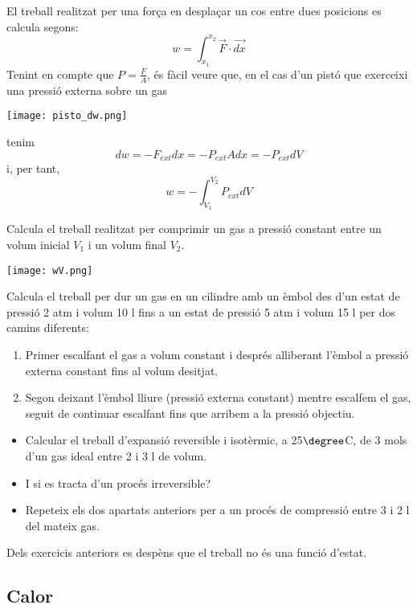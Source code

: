 El treball realitzat per una força en desplaçar un cos entre dues posicions es calcula segons:
\[
w=\int_{x_1}^{x_2} \vec{F} \cdot \vec{dx}
\]
Tenint en compte que $P=\frac{F}{A}$, és fàcil veure que, en el cas d'un pistó que exerceixi una pressió externa sobre un gas 
\begin{center}
\texttt{[image: pisto\_dw.png]}
\end{center}
tenim
\[
dw=-F_{ext}dx = -P_{ext} A dx = -P_{ext} dV
\]
i, per tant,
\[
w=-\int_{V_1}^{V_2} P_{ext} dV
\]
\begin{exr}
Calcula el treball realitzat per comprimir un gas a pressió constant entre un volum inicial $V_1$ i un volum final $V_2$.
\begin{center}
\texttt{[image: wV.png]}
\end{center}
\end{exr}
\begin{exr}
Calcula el treball per dur un gas en un cilindre amb un èmbol des d'un estat de pressió 2 atm i volum 10 l fins a un estat de pressió 5 atm i volum 15 l per dos camins diferents:
\begin{enumerate}
\item Primer escalfant el gas a volum constant i després alliberant l'èmbol a pressió externa constant fins al volum desitjat.
\item Segon deixant l'èmbol lliure (pressió externa constant) mentre escalfem el gas, seguit de continuar escalfant fins que arribem a la pressió objectiu.  
\end{enumerate}
\end{exr}
\begin{exr}
\begin{itemize}
\item Calcular el treball d'expansió reversible i isotèrmic, a 25$\degree$C, de 3 mols d'un gas ideal entre 2 i 3 l de volum.
\item I si es tracta d'un procés irreversible?
\item Repeteix els dos apartats anteriors per a un procés de compressió entre 3 i 2 l del mateix gas.
\end{itemize}
\end{exr}

Dels exercicis anteriors es despèns que el treball no és una funció d'estat.

\subsection{Calor}

